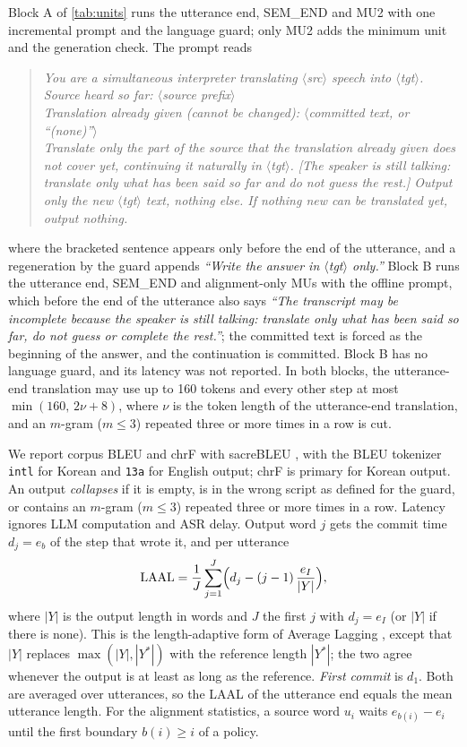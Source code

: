 Block A of \cref{tab:units} runs the utterance end, SEM\_END and MU2 with one incremental prompt and the language guard; only MU2 adds the minimum unit and the generation check. The prompt reads
\begin{quote}\small\itshape
You are a simultaneous interpreter translating $\langle$src$\rangle$ speech into $\langle$tgt$\rangle$.\\
Source heard so far: $\langle$source prefix$\rangle$\\
Translation already given (cannot be changed): $\langle$committed text, or ``(none)''$\rangle$\\
Translate only the part of the source that the translation already given does not cover yet, continuing it naturally in $\langle$tgt$\rangle$. [The speaker is still talking: translate only what has been said so far and do not guess the rest.] Output only the new $\langle$tgt$\rangle$ text, nothing else. If nothing new can be translated yet, output nothing.
\end{quote}
where the bracketed sentence appears only before the end of the utterance, and a regeneration by the guard appends \textit{``Write the answer in $\langle$tgt$\rangle$ only.''} Block B runs the utterance end, SEM\_END and alignment-only MUs with the offline prompt, which before the end of the utterance also says \textit{``The transcript may be incomplete because the speaker is still talking: translate only what has been said so far, do not guess or complete the rest.''}; the committed text is forced as the beginning of the answer, and the continuation is committed. Block B has no language guard, and its latency was not reported. In both blocks, the utterance-end translation may use up to 160 tokens and every other step at most $\min(160,\,2\nu+8)$, where $\nu$ is the token length of the utterance-end translation, and an $m$-gram ($m\le3$) repeated three or more times in a row is cut.

We report corpus BLEU \citep{papineni2002bleu} and chrF with sacreBLEU \citep{post2018call}, with the BLEU tokenizer \texttt{intl} for Korean and \texttt{13a} for English output; chrF is primary for Korean output. An output \emph{collapses} if it is empty, is in the wrong script as defined for the guard, or contains an $m$-gram ($m\le3$) repeated three or more times in a row. Latency ignores LLM computation and ASR delay. Output word $j$ gets the commit time $d_j=e_b$ of the step that wrote it, and per utterance
\[
  \mathrm{LAAL}=\frac{1}{J}\sum_{j=1}^{J}\Bigl(d_j-(j-1)\,\frac{e_I}{|Y|}\Bigr),
\]
where $|Y|$ is the output length in words and $J$ the first $j$ with $d_j=e_I$ (or $|Y|$ if there is none). This is the length-adaptive form \citep{papi2022overgeneration} of Average Lagging \citep{ma2019stacl}, except that $|Y|$ replaces $\max(|Y|,|Y^*|)$ with the reference length $|Y^*|$; the two agree whenever the output is at least as long as the reference. \emph{First commit} is $d_1$. Both are averaged over utterances, so the LAAL of the utterance end equals the mean utterance length.
For the alignment statistics, a source word $u_i$ waits $e_{b(i)}-e_i$ until the first boundary $b(i)\ge i$ of a policy.

